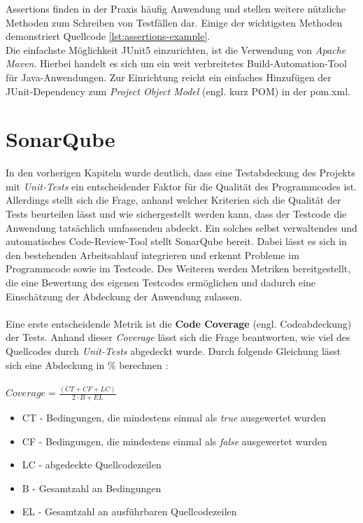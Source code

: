 Assertions finden in der Praxis häufig Anwendung und stellen weitere nützliche Methoden zum Schreiben von Testfällen dar. Einige der wichtigsten Methoden demonstriert Quellcode \ref{lst:assertions-example}.\\

Die einfachste Möglichkeit JUnit5 einzurichten, ist die Verwendung von \textit{Apache Maven}. Hierbei handelt es sich um ein weit verbreitetes Build-Automation-Tool für Java-Anwendungen. Zur Einrichtung reicht ein einfaches Hinzufügen der JUnit-Dependency zum \textit{Project Object Model} (engl. kurz POM) in der pom.xml. \cite*{baeldungGuideJUnitBaeldung2016}

\section{SonarQube}
In den vorherigen Kapiteln wurde deutlich, dass eine Testabdeckung des Projekts mit \textit{Unit-Tests} ein entscheidender Faktor für die Qualität des Programmcodes ist. Allerdings stellt sich die Frage, anhand welcher Kriterien sich die Qualität der Tests beurteilen lässt und wie sichergestellt werden kann, dass der Testcode die Anwendung tatsächlich umfassenden abdeckt. Ein solches selbst verwaltendes und automatisches Code-Review-Tool stellt SonarQube bereit. Dabei lässt es sich in den bestehenden Arbeitsablauf integrieren und erkennt Probleme im Programmcode sowie im Testcode. \cite*{SonarQube10} Des Weiteren werden Metriken bereitgestellt, die eine Bewertung des eigenen Testcodes ermöglichen und dadurch eine Einschätzung der Abdeckung der Anwendung zulassen.\\\\
Eine erste entscheidende Metrik ist die \textbf{Code Coverage} (engl. Codeabdeckung) der Tests. Anhand dieser \textit{Coverage} lässt sich die Frage beantworten, wie viel des Quellcodes durch \textit{Unit-Tests} abgedeckt wurde. Durch folgende Gleichung lässt sich eine Abdeckung in \% berechnen \cite*{MetricDefinition}:\\\\
$Coverage = \frac{(CT + CF + LC)}{2 \cdot B + EL}$
\begin{itemize}
    \setlength{\parskip}{1pt}
    \item CT - Bedingungen, die mindestens einmal als \textit{true} ausgewertet wurden
    \item CF - Bedingungen, die mindestens einmal als \textit{false} ausgewertet wurden
    \item LC - abgedeckte Quellcodezeilen
    \item B - Gesamtzahl an Bedingungen
    \item EL - Gesamtzahl an ausführbaren Quellcodezeilen
\end{itemize}
